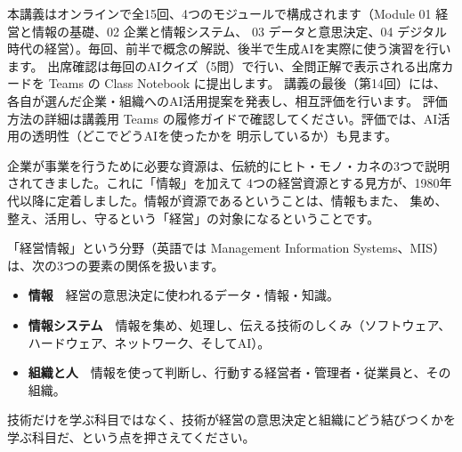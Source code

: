 


本講義はオンラインで全15回、4つのモジュールで構成されます（Module 01 経営と情報の基礎、02 企業と情報システム、
03 データと意思決定、04 デジタル時代の経営）。毎回、前半で概念の解説、後半で生成AIを実際に使う演習を行います。
出席確認は毎回のAIクイズ（5問）で行い、全問正解で表示される出席カードを Teams の Class Notebook に提出します。
講義の最後（第14回）には、各自が選んだ企業・組織へのAI活用提案を発表し、相互評価を行います。
評価方法の詳細は講義用 Teams の履修ガイドで確認してください。評価では、AI活用の透明性（どこでどうAIを使ったかを
明示しているか）も見ます。

企業が事業を行うために必要な資源は、伝統的にヒト・モノ・カネの3つで説明されてきました。これに「情報」を加えて
4つの経営資源とする見方が、1980年代以降に定着しました。情報が資源であるということは、情報もまた、
集め、整え、活用し、守るという「経営」の対象になるということです。

「経営情報」という分野（英語では Management Information Systems、MIS）は、次の3つの要素の関係を扱います。
\begin{itemize}
  \item \textbf{情報}　経営の意思決定に使われるデータ・情報・知識。
  \item \textbf{情報システム}　情報を集め、処理し、伝える技術のしくみ（ソフトウェア、ハードウェア、ネットワーク、そしてAI）。
  \item \textbf{組織と人}　情報を使って判断し、行動する経営者・管理者・従業員と、その組織。
\end{itemize}
技術だけを学ぶ科目ではなく、技術が経営の意思決定と組織にどう結びつくかを学ぶ科目だ、という点を押さえてください。

